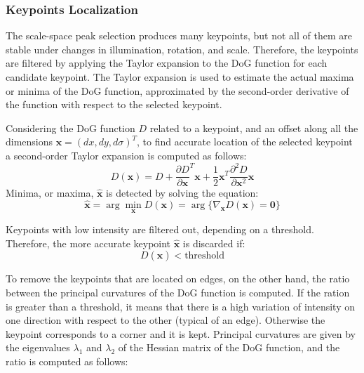 \subsubsection*{Keypoints Localization}
The scale-space peak selection produces many keypoints, but not all of them are 
stable under changes in illumination, rotation, and scale. Therefore, the 
keypoints are filtered by applying the Taylor expansion to the DoG function 
for each candidate keypoint. The Taylor expansion is used to estimate 
the actual maxima or minima of the DoG function, approximated by the 
second-order derivative of the function with respect to the selected keypoint.

Considering the DoG function $D$ related to a keypoint, and an offset 
along all the dimensions
$\boldsymbol{x} = (dx, dy, d\sigma)^T$, 
to find accurate location of the selected keypoint a second-order Taylor expansion 
is computed as follows:
\begin{equation}
    D(\boldsymbol{x}) = D + \frac{\partial D}{\partial \boldsymbol{x}}^T \boldsymbol{x} + 
    \frac{1}{2} \boldsymbol{x}^T \frac{\partial^2 D}{\partial \boldsymbol{x}^2} \boldsymbol{x}
    \label{eq:taylor_expansion}
\end{equation}
Minima, or maxima, $\boldsymbol{\hat{x}}$ is detected by solving the equation:
\begin{equation}
    \boldsymbol{\hat{x}} = \arg \min_{\boldsymbol{x}} D(\boldsymbol{x})
    = \arg \{ \nabla_{\boldsymbol{x}} D(\boldsymbol{x}) = \boldsymbol{0} \}
\end{equation}

Keypoints with low intensity are filtered out, depending on a threshold. Therefore, 
the more accurate keypoint $\boldsymbol{\hat{x}}$ is discarded if:
\begin{equation}
    D(\boldsymbol{\hat{x}}) < \text{threshold}
\label{eq:contrast_threshold}
\end{equation}

To remove the keypoints that are located on edges, on the other hand, the ratio 
between the principal curvatures of the DoG function is computed. 
If the ration is greater than a threshold, it means that there is a high variation 
of intensity on one direction with respect to the other (typical of an edge). 
Otherwise the keypoint corresponds to a corner and it is kept.
Principal curvatures are given by the eigenvalues $\lambda_1$ and $\lambda_2$
of the Hessian matrix of the 
DoG function, and the ratio is computed as follows:

